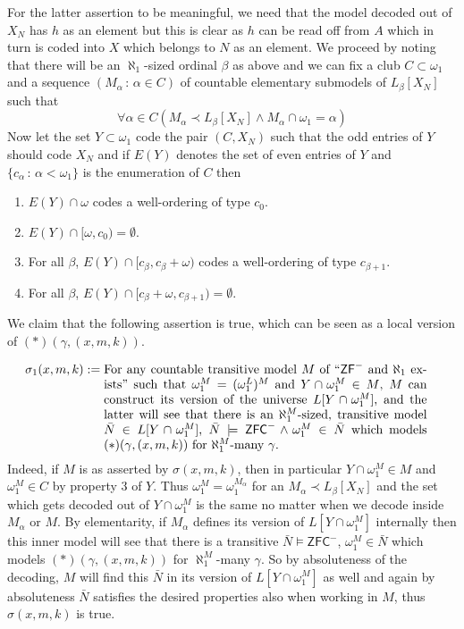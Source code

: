 \documentclass[a4paper,11pt]{article}
\newcommand{\ZFC}{\mathsf{ZFC}}
\newcommand{\ZFP}{\mathsf{ZF}^-}
\begin{document}
For the latter assertion to be meaningful, we need that the model decoded out of $X_N$ has $h$ as an element but this is clear as $h$ can be read off from $A$ which in turn is coded into $X$ which belongs to $N$ as an element.
We proceed by noting that there will be an $\aleph_1$-sized ordinal $\beta$ as above and we can fix a club $C \subset \omega_1$ and a sequence $(M_{\alpha} \, : \, \alpha \in C)$ of countable elementary submodels  of $L_{\beta} [X_N]$ such that
\[\forall \alpha \in C (M_{\alpha} \prec L_{\beta}[X_N] \land M_{\alpha} \cap \omega_1 = \alpha)\]
Now let the set $Y\subset \omega_1$ code the pair $(C, X_N)$ such that the odd entries of $Y$ should code $X_N$ and if $E(Y)$ denotes  the set of even entries of $Y$ and $\{c_{\alpha} \, : \, \alpha < \omega_1\}$ is the enumeration of $C$ then
\begin{enumerate}
\item $E(Y) \cap \omega$ codes a well-ordering of type $c_0$.
\item $E(Y) \cap [\omega, c_0) = \emptyset$.
\item For all $\beta$, $E(Y) \cap [c_{\beta}, c_{\beta} + \omega)$ codes a well-ordering of type $c_{\beta+1}$.
\item For all $\beta$, $E(Y) \cap [c_{\beta}+\omega, c_{\beta+1})= \emptyset$.
\end{enumerate}
We claim that the following assertion is true, which can be seen as a local version of $(\ast)(\gamma, (x,m,k))$.


\begin{align*}
\sigma_1 (x,m,k) := {} & \parbox[t]{0.75\textwidth}{For any countable transitive model $M$ of ``$\ZFP$ and $\aleph_1$ exists'' such that $\omega_1^M=(\omega_1^L)^M$ and $Y \cap \omega_1^M \in M$, $M$ can construct its version of the universe $L[Y \cap \omega_1^M]$, and the latter will see that there is an $\aleph_1^M$-sized, transitive model $\bar{N} \in L[Y \cap \omega_1^M]$, $\bar{N} \models \ZFC^- \land \omega_1^M \in \bar{N}$ which models $(\ast) ({\gamma,(x,m,k)})$ for $\aleph_1^M$-many $\gamma$.}
\end{align*}
Indeed, if $M$ is as asserted by $\sigma(x,m,k)$, then in particular $Y \cap \omega_1^M \in M$  and $\omega_1^M \in C$ by property 3 of $Y$. Thus $\omega_1^M= \omega_1^{M_{\alpha}}$ for an $M_{\alpha} \prec L_{\beta}[X_N]$ and the set which gets decoded out of $Y \cap \omega_1^M$ is the same no matter when we decode inside $M_{\alpha}$
or $M$. By elementarity, if $M_{\alpha}$ defines its version of $L[Y \cap \omega_1^M]$ internally then this inner model will see that there is a transitive $\bar{N} \models \ZFC^-$, $\omega_1^M  \in \bar{N} $ which models $(\ast) (\gamma,(x,m,k))$ for $\aleph_1^M$-many $\gamma$. So by absoluteness of the decoding, $M$ will find this $\bar{N}$ in its version of $L[Y \cap \omega_1^M]$ as well and again by absoluteness $\bar{N}$ satisfies the desired properties also when working in $M$, thus $\sigma(x,m,k)$ is true.  
\end{document}
